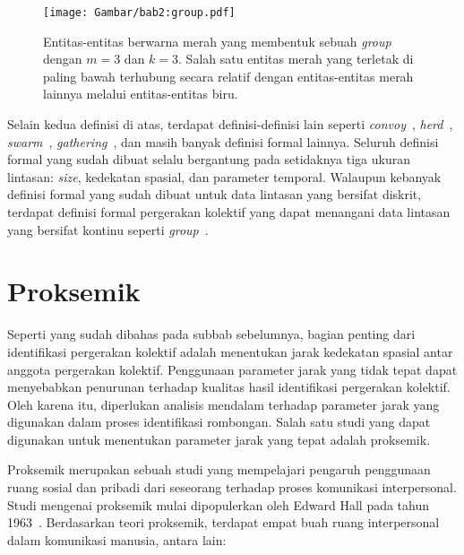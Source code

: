 \begin{itemize}
    \begin{figure}[htbp]
        \centering
        \captionsetup{width=0.75\textwidth}
        \texttt{[image: Gambar/bab2:group.pdf]}
        \caption[Sebuah \textit{group}]{Entitas-entitas berwarna merah yang membentuk sebuah \textit{group} dengan $m = 3$ dan $k = 3$. Salah satu entitas merah yang terletak di paling bawah terhubung secara relatif dengan entitas-entitas merah lainnya melalui entitas-entitas biru.}
        \label{bab2:group}
    \end{figure}
\end{itemize}

Selain kedua definisi di atas, terdapat definisi-definisi lain seperti \textit{convoy}~\cite{jeung:convoys}, \textit{herd}~\cite{huang:02:herd}, \textit{swarm}~\cite{li:swarm}, \textit{gathering}~\cite{zheng:02:gatherings}, dan masih banyak definisi formal lainnya. Seluruh definisi formal yang sudah dibuat selalu bergantung pada setidaknya tiga ukuran lintasan: \textit{size}, kedekatan spasial, dan parameter temporal. Walaupun kebanyak definisi formal yang sudah dibuat untuk data lintasan yang bersifat diskrit, terdapat definisi formal pergerakan kolektif yang dapat menangani data lintasan yang bersifat kontinu seperti \textit{group}~\cite{buchin:group}.

\section{Proksemik}
\label{sec:proxemic}

Seperti yang sudah dibahas pada subbab sebelumnya, bagian penting dari identifikasi pergerakan kolektif adalah menentukan jarak kedekatan spasial antar anggota pergerakan kolektif. Penggunaan parameter jarak yang tidak tepat dapat menyebabkan penurunan terhadap kualitas hasil identifikasi pergerakan kolektif. Oleh karena itu, diperlukan analisis mendalam terhadap parameter jarak yang digunakan dalam proses identifikasi rombongan. Salah satu studi yang dapat digunakan untuk menentukan parameter jarak yang tepat adalah proksemik.

Proksemik merupakan sebuah studi yang mempelajari pengaruh penggunaan ruang sosial dan pribadi dari seseorang terhadap proses komunikasi interpersonal. Studi mengenai proksemik mulai dipopulerkan oleh Edward Hall pada tahun 1963~\cite{hall:06:proxemic}. Berdasarkan teori proksemik, terdapat empat buah ruang interpersonal dalam komunikasi manusia, antara lain:

